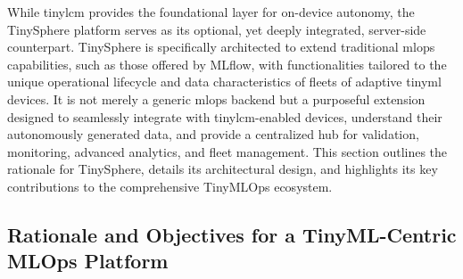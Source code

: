 While \gls{tinylcm} provides the foundational layer for on-device autonomy, the TinySphere platform serves as its optional, yet deeply integrated, server-side counterpart. TinySphere is specifically architected to extend traditional \gls{mlops} capabilities, such as those offered by MLflow, with functionalities tailored to the unique operational lifecycle and data characteristics of fleets of adaptive \gls{tinyml} devices. It is not merely a generic \gls{mlops} backend but a purposeful extension designed to seamlessly integrate with \gls{tinylcm}-enabled devices, understand their autonomously generated data, and provide a centralized hub for validation, monitoring, advanced analytics, and fleet management. This section outlines the rationale for TinySphere, details its architectural design, and highlights its key contributions to the comprehensive TinyMLOps ecosystem.

\subsection{Rationale and Objectives for a TinyML-Centric MLOps Platform}
\label{ssec:tinysphere_rationale}

